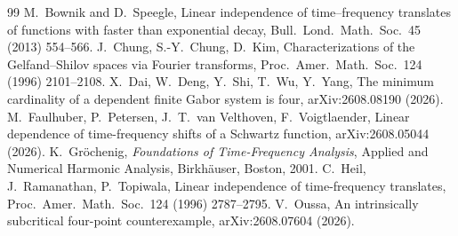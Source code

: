 \documentclass[10pt,a4paper]{amsart}
\begin{document}
\begin{thebibliography}{99}
 M.\ Bownik and D.\ Speegle, Linear independence of time--frequency translates of functions with faster than exponential decay, Bull.\ Lond.\ Math.\ Soc.\ 45 (2013) 554--566.
 J.\ Chung, S.-Y.\ Chung, D.\ Kim, Characterizations of the Gelfand--Shilov spaces via Fourier transforms, Proc.\ Amer.\ Math.\ Soc.\ 124 (1996) 2101--2108.
 X.\ Dai, W.\ Deng, Y.\ Shi, T.\ Wu, Y.\ Yang, The minimum cardinality of a dependent finite Gabor system is four, arXiv:2608.08190 (2026).
 M.\ Faulhuber, P.\ Petersen, J.\ T.\ van Velthoven, F.\ Voigtlaender, Linear dependence of time-frequency shifts of a Schwartz function, arXiv:2608.05044 (2026).
 K.\ Gr\"ochenig, \emph{Foundations of Time-Frequency Analysis}, Applied and Numerical Harmonic Analysis, Birkh\"auser, Boston, 2001.
 C.\ Heil, J.\ Ramanathan, P.\ Topiwala, Linear independence of time-frequency translates, Proc.\ Amer.\ Math.\ Soc.\ 124 (1996) 2787--2795.
 V.\ Oussa, An intrinsically subcritical four-point counterexample, arXiv:2608.07604 (2026).
\end{thebibliography}
\end{document}
